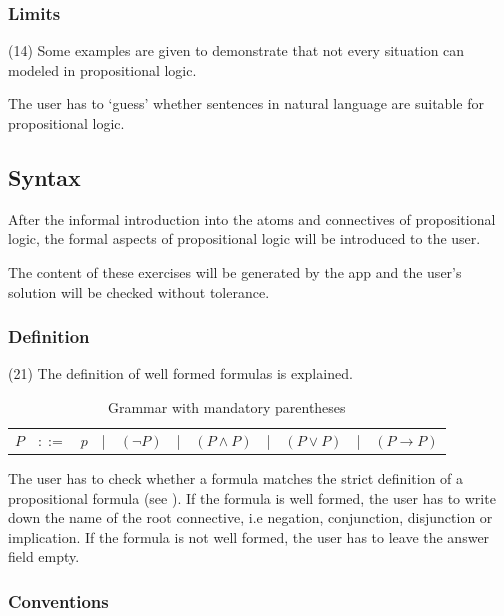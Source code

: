 \subsubsection{Limits}
\label{tut:14}

(14) Some examples are given to demonstrate that not every situation can modeled in propositional logic.

The user has to ‘guess’ whether sentences in natural language are suitable for propositional logic.

\subsection{Syntax}

After the informal introduction into the atoms and connectives of propositional logic, 
the formal aspects of propositional logic will be introduced to the user.

The content of these exercises will be generated by the app and the user's solution will be checked without tolerance.

\subsubsection{Definition}
\label{tut:21}

(21) The definition of well formed formulas is explained. 

\begin{table}[htdp]
\begin{center}
\begin{tabular}{rcccccccccc}
$P$	&$::=$	&$p$ 	
	&|		& $(\neg P)$ 
	&|		&  $(P \wedge P)$ 
	&|		&  $(P \vee P)$ 
	&|		&  $(P \rightarrow P)$ \\
\end{tabular}
\caption{Grammar with mandatory parentheses}
\label{tab:BNFGRPA}
\end{center}
\end{table}

The user has to check whether a formula matches the strict definition of 
a propositional formula (see ).
If the formula is well formed, the user has to write down the name of the root connective, i.e
negation, conjunction, disjunction or implication. 
If the formula is not well formed, the user has to leave the answer field empty.

\subsubsection{Conventions}
\label{tut:22}

